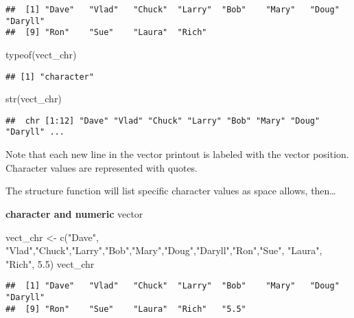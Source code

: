 \documentclass[
]{article}
\newenvironment{Shaded}{\begin{snugshade}}{\end{snugshade}}
\newcommand{\FloatTok}[1]{\textcolor[rgb]{0.00,0.00,0.81}{#1}}
\newcommand{\FunctionTok}[1]{\textcolor[rgb]{0.00,0.00,0.00}{#1}}
\newcommand{\NormalTok}[1]{#1}
\newcommand{\OtherTok}[1]{\textcolor[rgb]{0.56,0.35,0.01}{#1}}
\newcommand{\StringTok}[1]{\textcolor[rgb]{0.31,0.60,0.02}{#1}}
\begin{document}
\begin{verbatim}
##  [1] "Dave"   "Vlad"   "Chuck"  "Larry"  "Bob"    "Mary"   "Doug"   "Daryll"
##  [9] "Ron"    "Sue"    "Laura"  "Rich"
\end{verbatim}

\begin{Shaded}
\begin{Highlighting}[]
\FunctionTok{typeof}\NormalTok{(vect\_chr)}
\end{Highlighting}
\end{Shaded}

\begin{verbatim}
## [1] "character"
\end{verbatim}

\begin{Shaded}
\begin{Highlighting}[]
\FunctionTok{str}\NormalTok{(vect\_chr)}
\end{Highlighting}
\end{Shaded}

\begin{verbatim}
##  chr [1:12] "Dave" "Vlad" "Chuck" "Larry" "Bob" "Mary" "Doug" "Daryll" ...
\end{verbatim}

Note that each new line in the vector printout is labeled with the
vector position. Character values are represented with quotes.

The structure function will list specific character values as space
allows, then\ldots{}

\textbf{character and numeric} vector

\begin{Shaded}
\begin{Highlighting}[]
\NormalTok{vect\_chr }\OtherTok{\textless{}{-}} \FunctionTok{c}\NormalTok{(}\StringTok{"Dave"}\NormalTok{, }\StringTok{"Vlad"}\NormalTok{,}\StringTok{"Chuck"}\NormalTok{,}\StringTok{"Larry"}\NormalTok{,}\StringTok{"Bob"}\NormalTok{,}\StringTok{"Mary"}\NormalTok{,}\StringTok{"Doug"}\NormalTok{,}\StringTok{"Daryll"}\NormalTok{,}\StringTok{"Ron"}\NormalTok{,}\StringTok{"Sue"}\NormalTok{, }\StringTok{"Laura"}\NormalTok{, }\StringTok{"Rich"}\NormalTok{, }\FloatTok{5.5}\NormalTok{)}
\NormalTok{vect\_chr}
\end{Highlighting}
\end{Shaded}

\begin{verbatim}
##  [1] "Dave"   "Vlad"   "Chuck"  "Larry"  "Bob"    "Mary"   "Doug"   "Daryll"
##  [9] "Ron"    "Sue"    "Laura"  "Rich"   "5.5"
\end{verbatim}
\end{document}

